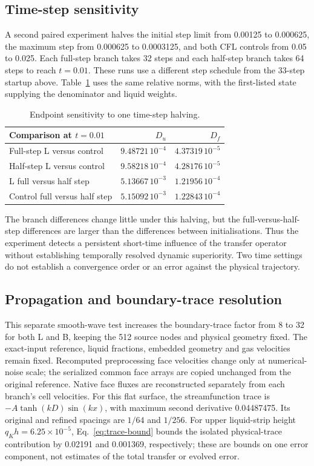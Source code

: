 \documentclass[10pt]{article}
\begin{document}
\subsection{Time-step sensitivity}\label{app:time-step}
A second paired experiment halves the initial step limit from 0.00125 to
0.000625, the maximum step from 0.000625 to 0.0003125, and both CFL controls
from 0.05 to 0.025. Each full-step branch takes 32 steps and each
half-step branch takes 64 steps to reach $t=0.01$. These runs use a different
step schedule from the 33-step startup above. Table~\ref{tab:timestep} uses the same relative norms,
with the first-listed state supplying the denominator and liquid weights.

\begin{table}[htbp]\centering\small
\caption{Endpoint sensitivity to one time-step halving.}
\label{tab:timestep}
\begin{tabular}{lrr}\toprule
Comparison at $t=0.01$ & $D_u$ & $D_f$\\\midrule
Full-step L versus control & $9.48721\,10^{-4}$ & $4.37319\,10^{-5}$\\
Half-step L versus control & $9.58218\,10^{-4}$ & $4.28176\,10^{-5}$\\
L full versus half step & $5.13667\,10^{-3}$ & $1.21956\,10^{-4}$\\
Control full versus half step & $5.15092\,10^{-3}$ & $1.22843\,10^{-4}$\\
\bottomrule\end{tabular}
\end{table}

The branch differences change little under this halving, but the
full-versus-half-step differences are larger than the differences between
initialisations. Thus the experiment detects a persistent short-time
influence of the transfer operator without establishing temporally resolved
dynamic superiority. Two time settings do not establish a convergence
order or an error against the physical trajectory.

\subsection{Propagation and boundary-trace resolution}
This separate smooth-wave test increases the boundary-trace factor from 8
to 32 for both L and B, keeping the 512 source nodes and physical geometry
fixed. The exact-input reference, liquid fractions, embedded geometry and
gas velocities remain fixed. Recomputed preprocessing face velocities change
only at numerical-noise scale; the serialized common face arrays are copied
unchanged from the original reference. Native face fluxes are reconstructed
separately from each branch's cell velocities. For this flat surface, the
streamfunction trace is $-A\tanh(kD)\sin(kx)$, with maximum second
derivative 0.04487475. Its original and refined spacings are $1/64$ and
$1/256$. For upper liquid-strip height $q_Kh=6.25\times10^{-5}$,
Eq.~\eqref{eq:trace-bound} bounds the isolated physical-trace contribution
by 0.02191 and 0.001369, respectively; these are bounds on one error
component, not estimates of the total transfer or evolved error.
\end{document}
